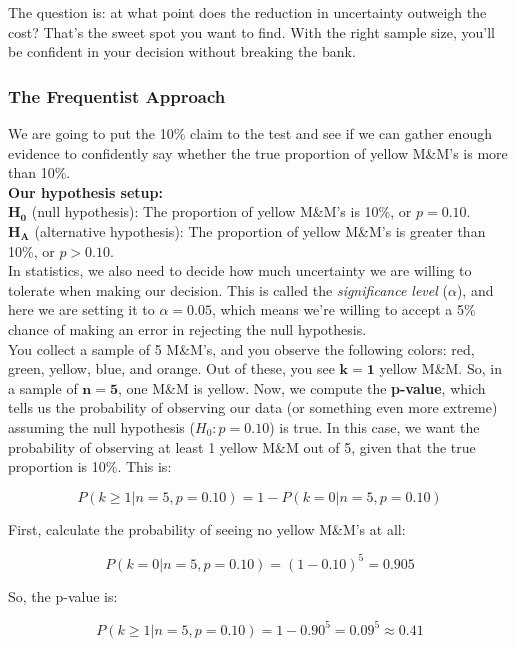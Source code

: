 The question is: at what point does the reduction in uncertainty outweigh the cost? That’s the sweet spot you want to find. With the right sample size, you’ll be confident in your decision without breaking the bank.

\subsubsection{The Frequentist Approach}

We are going to put the 10\% claim to the test and see if we can gather enough evidence to confidently say whether the true proportion of yellow M\&M’s is more than 10\%.\\

\textbf{Our hypothesis setup:}\\

\(\mathbf{H_0}\) (null hypothesis): The proportion of yellow M\&M’s is 10\%, or \(p = 0.10\).\\
\(\mathbf{H_A}\) (alternative hypothesis): The proportion of yellow M\&M’s is greater than 10\%, or \(p > 0.10\).\\

In statistics, we also need to decide how much uncertainty we are willing to tolerate when making our decision. This is called the \textit{significance level} (\(\alpha\)), and here we are setting it to \(\alpha = 0.05\), which means we’re willing to accept a 5\% chance of making an error in rejecting the null hypothesis.\\

You collect a sample of 5 M\&M’s, and you observe the following colors: red, green, yellow, blue, and orange. Out of these, you see \(\mathbf{k = 1}\) yellow M\&M. So, in a sample of \(\mathbf{n = 5}\), one M\&M is yellow. Now, we compute the \textbf{p-value}, which tells us the probability of observing our data (or something even more extreme) assuming the null hypothesis (\(H_0: p = 0.10\)) is true. In this case, we want the probability of observing at least 1 yellow M\&M out of 5, given that the true proportion is 10\%. This is:

\[
P(k \geq 1 | n = 5, p = 0.10) = 1 - P(k = 0 | n = 5, p = 0.10)
\]

First, calculate the probability of seeing no yellow M\&M’s at all:

\[
P(k = 0 | n = 5, p = 0.10) = (1 - 0.10)^5 = 0.905
\]

So, the p-value is:

\[
P(k \geq 1 | n = 5, p = 0.10) = 1 - 0.90^5 = 0.09^5 \approx 0.41
\]

